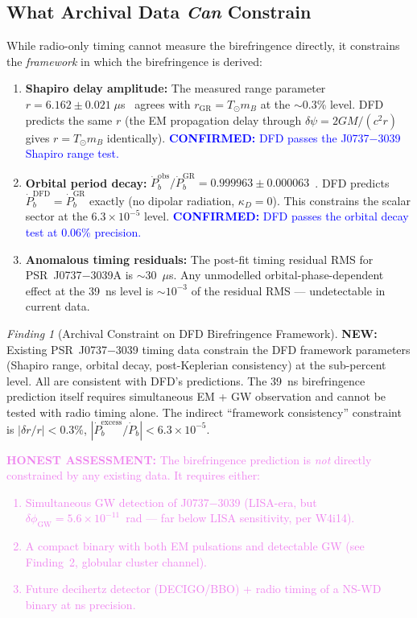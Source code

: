 \documentclass[11pt]{article}
\theoremstyle{definition}
\theoremstyle{remark}
\newtheorem{finding}[theorem]{Finding}
\newcommand{\ee}[1]{\times10^{#1}}
\newcommand{\confirmed}[1]{\textcolor{blue}{\textbf{CONFIRMED:} #1}}
\newcommand{\honest}[1]{\textcolor{violet}{\textbf{HONEST ASSESSMENT:} #1}}
\newcommand{\newresult}[1]{\textcolor{green!50!black}{\textbf{NEW:} #1}}
\begin{document}
\subsection{What Archival Data \emph{Can} Constrain}

While radio-only timing cannot measure the birefringence directly,
it constrains the \emph{framework} in which the birefringence is
derived:

\begin{enumerate}[nosep]
\item \textbf{Shapiro delay amplitude:} The measured range parameter
  $r = 6.162 \pm 0.021\;\mu$s~\cite{Kramer2021} agrees with
  $r_{\mathrm{GR}} = T_\odot m_B$ at the $\sim$0.3\% level. DFD
  predicts the same $r$ (the EM propagation delay through
  $\delta\psi = 2GM/(c^2 r)$ gives $r = T_\odot m_B$ identically).
  \confirmed{DFD passes the J0737$-$3039 Shapiro range test.}

\item \textbf{Orbital period decay:} $\dot{P}_b^{\mathrm{obs}} /
  \dot{P}_b^{\mathrm{GR}} = 0.999963 \pm 0.000063$~\cite{Kramer2021}.
  DFD predicts $\dot{P}_b^{\mathrm{DFD}} = \dot{P}_b^{\mathrm{GR}}$
  exactly (no dipolar radiation, $\kappa_D = 0$). This constrains
  the scalar sector at the $6.3\ee{-5}$ level.
  \confirmed{DFD passes the orbital decay test at 0.06\% precision.}

\item \textbf{Anomalous timing residuals:} The post-fit timing
  residual RMS for PSR~J0737$-$3039A is $\sim$30~$\mu$s. Any
  unmodelled orbital-phase-dependent effect at the 39~ns level is
  $\sim 10^{-3}$ of the residual RMS --- undetectable in current data.
\end{enumerate}

\begin{finding}[Archival Constraint on DFD Birefringence Framework]
\label{find:archival}
\newresult{Existing PSR~J0737$-$3039 timing data constrain the DFD
framework parameters (Shapiro range, orbital decay, post-Keplerian
consistency) at the sub-percent level. All are consistent with DFD's
predictions. The 39~ns birefringence prediction itself requires
simultaneous EM + GW observation and cannot be tested with radio
timing alone. The indirect ``framework consistency'' constraint is
$|\delta r / r| < 0.3\%$, $|\dot{P}_b^{\mathrm{excess}} /
\dot{P}_b| < 6.3\ee{-5}$.}

\honest{The birefringence prediction is \emph{not} directly
constrained by any existing data. It requires either:
\begin{enumerate}[nosep]
\item Simultaneous GW detection of J0737$-$3039 (LISA-era, but
  $\delta\phi_{\mathrm{GW}} = 5.6\ee{-11}$~rad --- far below LISA
  sensitivity, per W4i14).
\item A compact binary with both EM pulsations and detectable GW
  (see Finding~2, globular cluster channel).
\item Future decihertz detector (DECIGO/BBO) + radio timing of a
  NS-WD binary at ns precision.
\end{enumerate}}
\end{finding}
\end{document}
